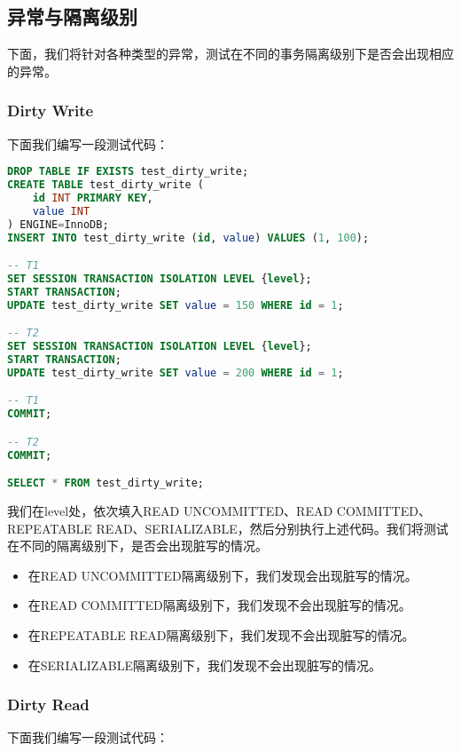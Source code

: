 \documentclass{article}
\begin{document}
\subsection{异常与隔离级别}

下面，我们将针对各种类型的异常，测试在不同的事务隔离级别下是否会出现相应的异常。

\subsubsection{Dirty Write}

下面我们编写一段测试代码：

\begin{lstlisting}[language=sql]
DROP TABLE IF EXISTS test_dirty_write;
CREATE TABLE test_dirty_write (
    id INT PRIMARY KEY,
    value INT
) ENGINE=InnoDB;
INSERT INTO test_dirty_write (id, value) VALUES (1, 100);

-- T1
SET SESSION TRANSACTION ISOLATION LEVEL {level};
START TRANSACTION;
UPDATE test_dirty_write SET value = 150 WHERE id = 1;

-- T2
SET SESSION TRANSACTION ISOLATION LEVEL {level};
START TRANSACTION;
UPDATE test_dirty_write SET value = 200 WHERE id = 1;

-- T1 
COMMIT;

-- T2 
COMMIT;

SELECT * FROM test_dirty_write;
\end{lstlisting}

我们在{level}处，依次填入READ UNCOMMITTED、READ COMMITTED、REPEATABLE READ、SERIALIZABLE，然后分别执行上述代码。我们将测试在不同的隔离级别下，是否会出现脏写的情况。

\begin{itemize}
    \item 在READ UNCOMMITTED隔离级别下，我们发现会出现脏写的情况。
    \item 在READ COMMITTED隔离级别下，我们发现不会出现脏写的情况。
    \item 在REPEATABLE READ隔离级别下，我们发现不会出现脏写的情况。
    \item 在SERIALIZABLE隔离级别下，我们发现不会出现脏写的情况。
\end{itemize}

\subsubsection{Dirty Read}

下面我们编写一段测试代码：
\end{document}
